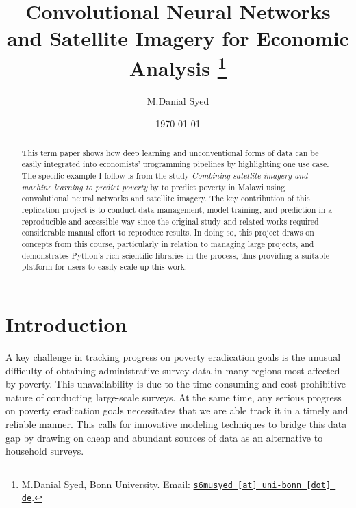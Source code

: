 \documentclass[11pt, a4paper, leqno]{article}
\begin{document}
\title{Convolutional Neural Networks and Satellite Imagery for Economic Analysis \thanks{M.Danial Syed, Bonn University. Email: \href{mailto:s6musyed@uni-bonn.de}{\nolinkurl{s6musyed [at] uni-bonn [dot] de}}.}}

\author{M.Danial Syed}

\date{
    \today
}

\maketitle


\begin{abstract}
 This term paper shows how deep learning and unconventional forms of data can be easily integrated into economists' programming pipelines by highlighting one use case. The specific example I follow is from the study \textit{Combining satellite imagery and machine learning to predict poverty} by \citet{jean2016combining} to predict poverty in Malawi using convolutional neural networks and satellite imagery. The key contribution of this replication project is to conduct data management, model training, and prediction in a reproducible and accessible way since the original study and related works required considerable manual effort to reproduce results. In doing so, this project draws on concepts from this course, particularly in relation to managing large projects, and demonstrates Python's rich scientific libraries in the process, thus providing a suitable platform for users to easily scale up this work.
\end{abstract}

\clearpage


\section{Introduction} %
\label{sec:introduction}

A key challenge in tracking progress on poverty eradication goals is the unusual difficulty of obtaining administrative survey data in many regions most affected by poverty. This unavailability is due to the time-consuming and cost-prohibitive nature of conducting large-scale surveys. At the same time, any serious progress on poverty eradication goals necessitates that we are able track it in a timely and reliable manner. This calls for innovative modeling techniques to bridge this data gap by drawing on cheap and abundant sources of data as an alternative to household surveys.
\end{document}
